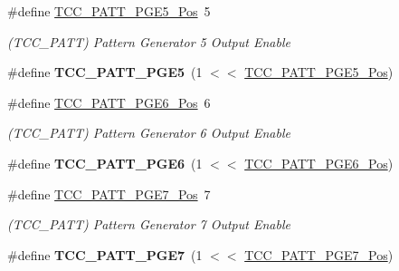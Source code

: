 \begin{DoxyCompactItemize}
\item 
\hypertarget{group___s_a_m_l21___t_c_c_gab94b69032a3857ebefe510ce67e63891}{}\#define \hyperlink{group___s_a_m_l21___t_c_c_gab94b69032a3857ebefe510ce67e63891}{T\+C\+C\+\_\+\+P\+A\+T\+T\+\_\+\+P\+G\+E5\+\_\+\+Pos}~5\label{group___s_a_m_l21___t_c_c_gab94b69032a3857ebefe510ce67e63891}

\begin{DoxyCompactList}\small\item\em (T\+C\+C\+\_\+\+P\+A\+T\+T) Pattern Generator 5 Output Enable \end{DoxyCompactList}\item 
\hypertarget{group___s_a_m_l21___t_c_c_ga95ff5672157a866e9325d39efe25578e}{}\#define {\bfseries T\+C\+C\+\_\+\+P\+A\+T\+T\+\_\+\+P\+G\+E5}~(1 $<$$<$ \hyperlink{group___s_a_m_l21___t_c_c_gab94b69032a3857ebefe510ce67e63891}{T\+C\+C\+\_\+\+P\+A\+T\+T\+\_\+\+P\+G\+E5\+\_\+\+Pos})\label{group___s_a_m_l21___t_c_c_ga95ff5672157a866e9325d39efe25578e}

\item 
\hypertarget{group___s_a_m_l21___t_c_c_ga3959a96d9d9482e559100a9cdf95c513}{}\#define \hyperlink{group___s_a_m_l21___t_c_c_ga3959a96d9d9482e559100a9cdf95c513}{T\+C\+C\+\_\+\+P\+A\+T\+T\+\_\+\+P\+G\+E6\+\_\+\+Pos}~6\label{group___s_a_m_l21___t_c_c_ga3959a96d9d9482e559100a9cdf95c513}

\begin{DoxyCompactList}\small\item\em (T\+C\+C\+\_\+\+P\+A\+T\+T) Pattern Generator 6 Output Enable \end{DoxyCompactList}\item 
\hypertarget{group___s_a_m_l21___t_c_c_ga737ddaed53e5e556d51b623fa1e66c1e}{}\#define {\bfseries T\+C\+C\+\_\+\+P\+A\+T\+T\+\_\+\+P\+G\+E6}~(1 $<$$<$ \hyperlink{group___s_a_m_l21___t_c_c_ga3959a96d9d9482e559100a9cdf95c513}{T\+C\+C\+\_\+\+P\+A\+T\+T\+\_\+\+P\+G\+E6\+\_\+\+Pos})\label{group___s_a_m_l21___t_c_c_ga737ddaed53e5e556d51b623fa1e66c1e}

\item 
\hypertarget{group___s_a_m_l21___t_c_c_ga7a883db7df93ee834b4946b82e39c7cf}{}\#define \hyperlink{group___s_a_m_l21___t_c_c_ga7a883db7df93ee834b4946b82e39c7cf}{T\+C\+C\+\_\+\+P\+A\+T\+T\+\_\+\+P\+G\+E7\+\_\+\+Pos}~7\label{group___s_a_m_l21___t_c_c_ga7a883db7df93ee834b4946b82e39c7cf}

\begin{DoxyCompactList}\small\item\em (T\+C\+C\+\_\+\+P\+A\+T\+T) Pattern Generator 7 Output Enable \end{DoxyCompactList}\item 
\hypertarget{group___s_a_m_l21___t_c_c_ga63c6b471c5fbac78b666f0311180089a}{}\#define {\bfseries T\+C\+C\+\_\+\+P\+A\+T\+T\+\_\+\+P\+G\+E7}~(1 $<$$<$ \hyperlink{group___s_a_m_l21___t_c_c_ga7a883db7df93ee834b4946b82e39c7cf}{T\+C\+C\+\_\+\+P\+A\+T\+T\+\_\+\+P\+G\+E7\+\_\+\+Pos})\label{group___s_a_m_l21___t_c_c_ga63c6b471c5fbac78b666f0311180089a}


\end{DoxyCompactItemize}
